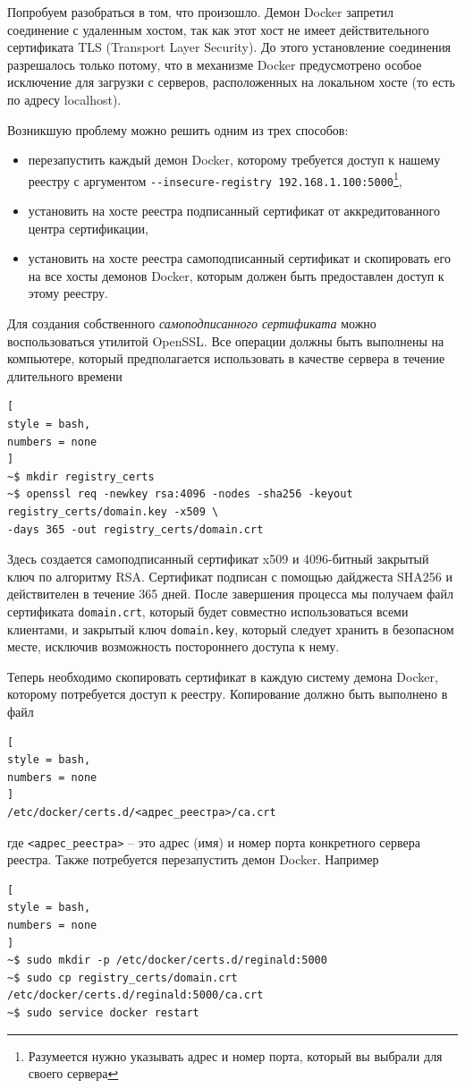 \documentclass[%
	11pt,
	a4paper,
	utf8,
		]{article}
\begin{document}
Попробуем разобраться в том, что произошло. Демон Docker запретил соединение с удаленным хостом, так как этот хост не имеет действительного сертификата TLS (Transport Layer Security). До этого установление соединения разрешалось только потому, что в механизме Docker предусмотрено особое исключение для загрузки с серверов, расположенных на локальном хосте (то есть по адресу localhost).

Возникшую проблему можно решить одним из трех способов:
\begin{itemize}
	\item перезапустить каждый демон Docker, которому требуется доступ к нашему реестру с аргументом \verb|--insecure-registry 192.168.1.100:5000|\footnote{Разумеется нужно указывать адрес и номер порта, который вы выбрали для своего сервера},
	
	\item установить на хосте реестра подписанный сертификат от аккредитованного центра сертификации,
	
	\item установить на хосте реестра самоподписанный сертификат и скопировать его на все хосты демонов Docker, которым должен быть предоставлен доступ к этому реестру.
\end{itemize}

Для создания собственного \emph{самоподписанного сертификата} можно воспользоваться утилитой OpenSSL. Все операции должны быть выполнены на компьютере, который предполагается использовать в качестве сервера в течение длительного времени
\begin{lstlisting}[
style = bash,
numbers = none
]
~$ mkdir registry_certs
~$ openssl req -newkey rsa:4096 -nodes -sha256 -keyout registry_certs/domain.key -x509 \
-days 365 -out registry_certs/domain.crt
\end{lstlisting}

Здесь создается самоподписанный сертификат x509 и 4096-битный закрытый ключ по алгоритму RSA. Сертификат подписан с помощью дайджеста SHA256 и действителен в течение 365 дней. После завершения процесса мы получаем файл сертификата \texttt{domain.crt}, который будет совместно использоваться всеми клиентами, и закрытый ключ \texttt{domain.key}, который следует хранить в безопасном месте, исключив возможность постороннего доступа к нему.

Теперь необходимо скопировать сертификат в каждую систему демона Docker, которому потребуется доступ к реестру. Копирование должно быть выполнено в файл
\begin{lstlisting}[
style = bash,
numbers = none
]
/etc/docker/certs.d/<адрес_реестра>/ca.crt
\end{lstlisting}
где \verb|<адрес_реестра>| -- это адрес (имя) и номер порта конкретного сервера реестра. Также потребуется перезапустить демон Docker. Например
\begin{lstlisting}[
style = bash,
numbers = none
]
~$ sudo mkdir -p /etc/docker/certs.d/reginald:5000
~$ sudo cp registry_certs/domain.crt /etc/docker/certs.d/reginald:5000/ca.crt
~$ sudo service docker restart
\end{lstlisting}
\end{document}
